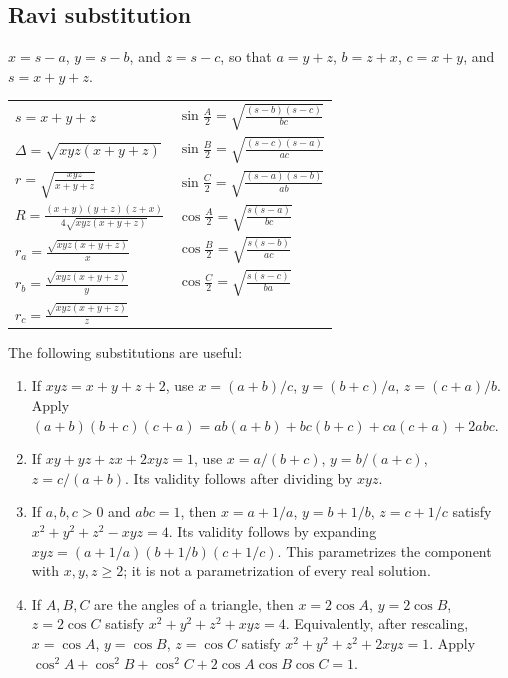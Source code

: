 \documentclass[11pt,a4paper]{article}
\begin{document}
\subsection{Ravi substitution}
$x=s-a$, $y=s-b$, and $z=s-c$, so that
$a=y+z$, $b=z+x$, $c=x+y$, and $s=x+y+z$.
\begin{center}
\renewcommand{\arraystretch}{1.75}
\begin{tabular}{@{}ll@{}}
$s=x+y+z$ &$\displaystyle\sin\frac A2=\sqrt{\frac{(s-b)(s-c)}{bc}}$\\
$\Delta=\sqrt{xyz(x+y+z)}$ &$\displaystyle\sin\frac B2=\sqrt{\frac{(s-c)(s-a)}{ac}}$\\
$\displaystyle r=\sqrt{\frac{xyz}{x+y+z}}$ &$\displaystyle\sin\frac C2=\sqrt{\frac{(s-a)(s-b)}{ab}}$\\
$\displaystyle R=\frac{(x+y)(y+z)(z+x)}{4\sqrt{xyz(x+y+z)}}$ &$\displaystyle\cos\frac A2=\sqrt{\frac{s(s-a)}{bc}}$\\
$\displaystyle r_a=\frac{\sqrt{xyz(x+y+z)}}x$ &$\displaystyle\cos\frac B2=\sqrt{\frac{s(s-b)}{ac}}$\\
$\displaystyle r_b=\frac{\sqrt{xyz(x+y+z)}}y$ &$\displaystyle\cos\frac C2=\sqrt{\frac{s(s-c)}{ba}}$\\
$\displaystyle r_c=\frac{\sqrt{xyz(x+y+z)}}z$ &
\end{tabular}
\end{center}

\setcounter{theorem}{65}\begin{lemma}
The following substitutions are useful:
\begin{enumerate}
\setcounter{enumi}{0}\item If $xyz=x+y+z+2$, use $x=(a+b)/c$, $y=(b+c)/a$, $z=(c+a)/b$.
Apply $(a+b)(b+c)(c+a)=ab(a+b)+bc(b+c)+ca(c+a)+2abc$.
\setcounter{enumi}{1}\item If $xy+yz+zx+2xyz=1$, use $x=a/(b+c)$, $y=b/(a+c)$, $z=c/(a+b)$.
Its validity follows after dividing by $xyz$.
\setcounter{enumi}{2}\item If $a,b,c>0$ and $abc=1$, then
$x=a+1/a$, $y=b+1/b$, $z=c+1/c$ satisfy $x^2+y^2+z^2-xyz=4$.
Its validity follows by expanding $xyz=(a+1/a)(b+1/b)(c+1/c)$.
This parametrizes the component with $x,y,z\geq2$; it is not a parametrization of every real solution.
\setcounter{enumi}{3}\item If $A,B,C$ are the angles of a triangle, then
$x=2\cos A$, $y=2\cos B$, $z=2\cos C$ satisfy $x^2+y^2+z^2+xyz=4$.
Equivalently, after rescaling, $x=\cos A$, $y=\cos B$, $z=\cos C$
satisfy $x^2+y^2+z^2+2xyz=1$.
Apply $\cos^2A+\cos^2B+\cos^2C+2\cos A\cos B\cos C=1$.
\end{enumerate}
\end{lemma}
\end{document}
